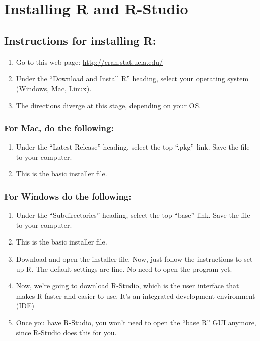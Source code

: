 \documentclass[
]{book}
\providecommand{\tightlist}{%
  \setlength{\itemsep}{0pt}\setlength{\parskip}{0pt}}
\begin{document}
\hypertarget{install}{%
\chapter{Installing R and R-Studio}\label{install}}

\hypertarget{instructions-for-installing-r}{%
\section{Instructions for installing R:}\label{instructions-for-installing-r}}

\begin{enumerate}
\def\labelenumi{\arabic{enumi}.}
\tightlist
\item
  Go to this web page: \url{http://cran.stat.ucla.edu/}
\item
  Under the ``Download and Install R'' heading, select your operating system (Windows, Mac,
  Linux).
\item
  The directions diverge at this stage, depending on your OS.
\end{enumerate}

\hypertarget{for-mac-do-the-following}{%
\subsection{For Mac, do the following:}\label{for-mac-do-the-following}}

\begin{enumerate}
\def\labelenumi{\arabic{enumi}.}
\tightlist
\item
  Under the ``Latest Release'' heading, select the top ``.pkg'' link. Save the file to your computer.
\item
  This is the basic installer file.
\end{enumerate}

\hypertarget{for-windows-do-the-following}{%
\subsection{For Windows do the following:}\label{for-windows-do-the-following}}

\begin{enumerate}
\def\labelenumi{\arabic{enumi}.}
\item
  Under the ``Subdirectories'' heading, select the top ``base'' link. Save the file to your computer.
\item
  This is the basic installer file.
\item
  Download and open the installer file. Now, just follow the instructions to set up R. The default settings are fine. No need to open the program yet.
\item
  Now, we're going to download R-Studio, which is the user interface that makes R faster and easier to use. It's an integrated development environment (IDE)
\item
  Once you have R-Studio, you won't need to open the ``base R'' GUI anymore, since R-Studio does this for you.
\end{enumerate}
\end{document}
